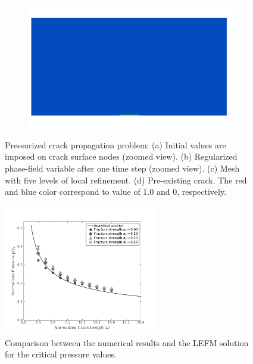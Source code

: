 \begin{figure}[htbp!]
\begin{subfigure}[t]{0.475\linewidth}
    \caption{}
    \label{fig:sneddon_mesh}
  \end{subfigure}
  \begin{subfigure}[t]{0.475\linewidth}\centering
    \includegraphics[width=\linewidth]{Chapter3/figures/sneddon_c}
    \caption{}
    \label{fig:sneddon_c}
  \end{subfigure}
  \caption[Sneddon benchmark problem.]{\label{fig:sneddon}Pressurized crack propagation problem: (a) Initial values are imposed on crack surface nodes (zoomed view). (b) Regularized phase-field variable after one time step (zoomed view). (c) Mesh with five levels of local refinement. (d) Pre-existing crack. The red and blue color correspond to value of 1.0 and 0, respectively.}
\end{figure}

\begin{figure}[!ht]
  \centering
  \includegraphics[width=0.6\textwidth]{Chapter3/figures/critical_pressure}
  \caption{Comparison between the numerical results and the LEFM solution for the critical pressure values.}
  \label{fig:critical_presssure}
\end{figure}
